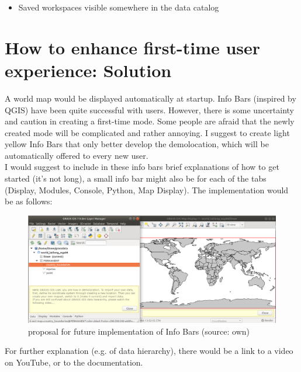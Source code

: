 \documentclass[a4paper,10pt,twoside]{article}
\begin{document}
\begin{itemize}
\item Saved workspaces visible somewhere in the data catalog
\end{itemize}

\newpage
\vspace*{-1cm}
\section{How to enhance first-time user experience: Solution}
\noindent
\large

A world map would be displayed automatically at startup.
Info Bars (inspired by QGIS) have been quite successful with users. However, there is some uncertainty and caution in creating a first-time mode. Some people are afraid that the newly created mode will be complicated and rather annoying.
I suggest to create light yellow Info Bars that only better develop the demolocation, which will be automatically offered to every new user.\\

\noindent I would suggest to include in these info bars brief explanations of how to get started (it's not long), a small info bar might also be for each of the tabs (Display, Modules, Console, Python, Map Display). The implementation would be as follows:

\vspace{0.3cm}
\begin{figure}[hbt!] 
\begin{center}
\includegraphics[width=15cm]{../pictures/infobars.png} 
\caption[proposal for future implementation of Info Bars]{proposal for future implementation of Info Bars (source: own)}
\label{fig:infobars}
\end{center}
\end{figure}

\noindent For further explanation (e.g. of data hierarchy), there would be a link to a video on YouTube, or to the documentation.
\end{document}
